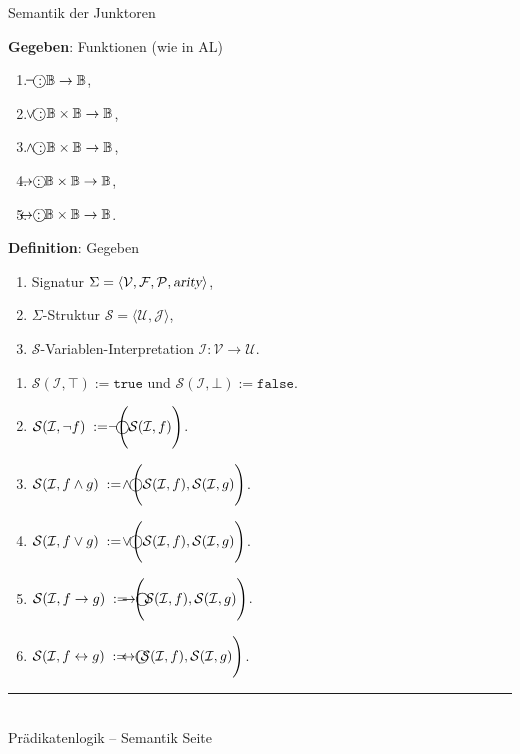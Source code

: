 \documentclass{slides}
\newcommand{\myrule}{\rule{20cm}{1mm}\\ }
\newcommand{\verum}{\top}
\newcommand{\falsum}{\bot}
\newcommand{\struct}{\mathcal{S}}
\newcommand{\circneg}{\mbox{$\bigcirc\hspace*{-0.54cm}\neg$}}
\newcommand{\circwedge}{\mbox{$\bigcirc\hspace*{-0.52cm}\wedge$}}
\newcommand{\circvee}{\mbox{$\bigcirc\hspace*{-0.52cm}\vee$}}
\newcommand{\circright}{\mbox{$\bigcirc\hspace*{-0.79cm}\rightarrow$}}
\newcommand{\circleftright}{\mbox{$\bigcirc\hspace*{-0.79cm}\leftrightarrow$}}
\newcounter{mypage}
\begin{document}

\begin{slide}{}
\normalsize
\begin{center}
Semantik der Junktoren
\end{center}
\vspace{0.5cm}

\footnotesize
\textbf{Gegeben}: Funktionen (wie in AL)
\begin{enumerate}
\item $\circneg: \mathbb{B} \rightarrow \mathbb{B}$,
\item $\circvee: \mathbb{B} \times \mathbb{B} \rightarrow \mathbb{B}$,
\item $\circwedge: \mathbb{B} \times \mathbb{B} \rightarrow \mathbb{B}$,
\item $\circright: \mathbb{B} \times \mathbb{B} \rightarrow \mathbb{B}$,
\item $\circleftright: \mathbb{B} \times \mathbb{B} \rightarrow \mathbb{B}$.
\end{enumerate}

\textbf{Definition}: Gegeben
\begin{enumerate}
\item Signatur $\Sigma = \langle \mathcal{V}, \mathcal{F}, \mathcal{P}, \textsl{arity} \rangle$,
\item $\Sigma$-Struktur $\struct = \langle \mathcal{U}, \mathcal{J} \rangle$,
\item $\struct$-Variablen-Interpretation $\mathcal{I}: \mathcal{V} \rightarrow \mathcal{U}$.
\end{enumerate}
\begin{enumerate}
\item $\struct(\mathcal{I},\verum) := \mathtt{true}$ und $\struct(\mathcal{I},\falsum) := \mathtt{false}$.
\item $\struct(\mathcal{I}, \neg f) \;:=\; \circneg\Bigg(\struct(\mathcal{I}, f)\Bigg)$.
\item $\struct(\mathcal{I}, f \wedge g) \;:=\; \circwedge\Bigg(\struct(\mathcal{I}, f), \struct(\mathcal{I}, g)\Bigg)$.
\item $\struct(\mathcal{I}, f \vee g) \;:=\; \circvee\Bigg(\struct(\mathcal{I}, f), \struct(\mathcal{I}, g)\Bigg)$.
\item $\struct(\mathcal{I}, f \rightarrow g) \;:=\; \circright\!\Bigg(\struct(\mathcal{I}, f), \struct(\mathcal{I}, g)\Bigg)$.
\item $\struct(\mathcal{I}, f \leftrightarrow g) \;:=\; \circleftright(\struct(\mathcal{I}, f), \struct(\mathcal{I}, g)\Bigg)$.
\end{enumerate}


\vspace*{\fill}
\tiny \addtocounter{mypage}{1}
\myrule
Prädikatenlogik -- Semantik  \hspace*{\fill} Seite 
\end{slide}
\end{document}
